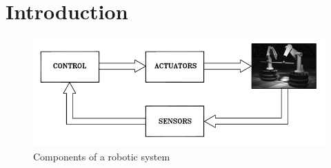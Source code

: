 \chapter{Introduction}
\begin{figure}[h]
    \centering
    \includegraphics[scale=1]{img/robotic_system.png}
    \caption{Components of a robotic system}
\end{figure}
\vspace{-0.5cm}
